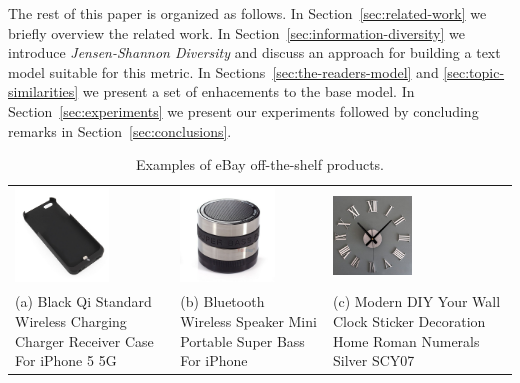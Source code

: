 The rest of this paper is organized as follows. In Section~\ref{sec:related-work} we briefly overview the related work. In Section~\ref{sec:information-diversity} we introduce {\em Jensen-Shannon Diversity} and discuss an approach for building a text model suitable for this metric. In Sections~\ref{sec:the-readers-model} and \ref{sec:topic-similarities} we present a set of enhacements to the base model. In Section~\ref{sec:experiments} we present our experiments followed by concluding remarks in Section~\ref{sec:conclusions}.

\begin{table}[t]
\begin{center}
\begin{tabular}{LLL}
\includegraphics[height=2.5cm]{figures/standard-iphone-case.jpg}&\includegraphics[height=2.5cm]{figures/standard-iphone-speaker.jpg}&\includegraphics[height=2.1cm]{figures/standard-clock.jpg}\\
(a) Black Qi Standard Wireless Charging Charger Receiver Case For iPhone 5 5G & (b) Bluetooth Wireless Speaker Mini Portable Super Bass For iPhone & (c) Modern DIY Your Wall Clock Sticker Decoration Home Roman Numerals Silver SCY07\\
\end{tabular}
\end{center}
\caption{Examples of eBay off-the-shelf products.}
\label{tab:ebay-standard-products}
\end{table}


